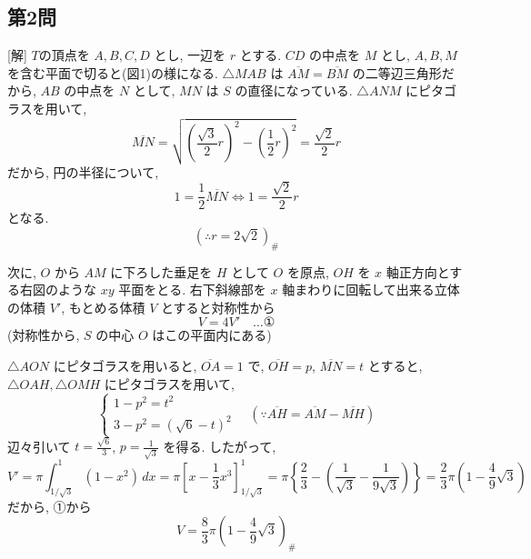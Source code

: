 \documentclass[../main.tex]{subfiles}
\begin{document}
\subsection*{第2問}

[解] $T$の頂点を $A, B, C, D$ とし, 一辺を $r$ とする. $CD$ の中点を $M$ とし, $A, B, M$ を含む平面で切ると(図1)の様になる. $\triangle MAB$ は $\overline{AM} = \overline{BM}$ の二等辺三角形だから, $AB$ の中点を $N$ として, $MN$ は $S$ の直径になっている. $\triangle ANM$ にピタゴラスを用いて,
\[
  \overline{MN} = \sqrt{\left(\frac{\sqrt{3}}{2}r\right)^2 - \left(\frac{1}{2}r\right)^2} = \frac{\sqrt{2}}{2}r
\]
だから, 円の半径について,
\[
  1 = \frac{1}{2}\overline{MN} \iff 1 = \frac{\sqrt{2}}{2}r
\]
となる.
\[
  \left(\therefore r = 2\sqrt{2}\right)_{\text{\#}}
\]

次に, $O$ から $AM$ に下ろした垂足を $H$ として $O$ を原点, $OH$ を $x$ 軸正方向とする右図のような $xy$ 平面をとる. 右下斜線部を $x$ 軸まわりに回転して出来る立体の体積 $V'$, もとめる体積 $V$ とすると対称性から
\[
  V = 4V' \quad \dots \text{①}
\]
(対称性から, $S$ の中心 $O$ はこの平面内にある)

$\triangle AON$ にピタゴラスを用いると, $\overline{OA} = 1$ で, $\overline{OH} = p$, $\overline{MN} = t$ とすると, $\triangle OAH, \triangle OMH$ にピタゴラスを用いて,
\[
  \begin{cases}
    1 - p^2 = t^2 \\
    3 - p^2 = (\sqrt{6} - t)^2
  \end{cases}
  \quad (\because \overline{AH} = \overline{AM} - \overline{MH})
\]
辺々引いて $t = \frac{\sqrt{6}}{3}$, $p = \frac{1}{\sqrt{3}}$ を得る. したがって,
\[
  V' = \pi \int_{1/\sqrt{3}}^1 (1-x^2) \, dx = \pi \left[ x - \frac{1}{3}x^3 \right]_{1/\sqrt{3}}^1 = \pi \left\{ \frac{2}{3} - \left( \frac{1}{\sqrt{3}} - \frac{1}{9\sqrt{3}} \right) \right\} = \frac{2}{3}\pi \left( 1 - \frac{4}{9}\sqrt{3} \right)
\]
だから, ①から
\[
  V = \frac{8}{3}\pi \left( 1 - \frac{4}{9}\sqrt{3} \right)_{\text{\#}}
\]
\end{document}
